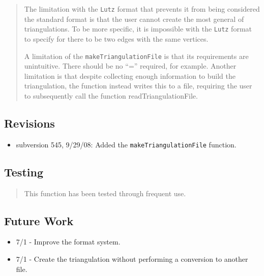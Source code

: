 \begin{quotation}
The limitation with the \texttt{Lutz} format that prevents it from being
considered the standard format is that the user cannot create the most
general of triangulations. To be more specific, it is impossible with the 
\texttt{Lutz} format to specify for there to be two edges with the same
vertices.

A limitation of the \texttt{makeTriangulationFile} is that its requirements
are unintuitive. There should be no ``='' required, for example. Another
limitation is that despite collecting enough information to build the
triangulation, the function instead writes this to a file, requiring the
user to subsequently call the function readTriangulationFile.
\end{quotation}

\subsection*{Revisions}

\begin{itemize}
\item subversion 545, 9/29/08: Added the \texttt{makeTriangulationFile}
function.
\end{itemize}

\subsection*{Testing}

\begin{quotation}
This function has been tested through frequent use.
\end{quotation}

\subsection*{Future Work}

\begin{itemize}
\item 7/1 - Improve the format system.

\item 7/1 - Create the triangulation without performing a conversion to
another file.
\end{itemize}


%
